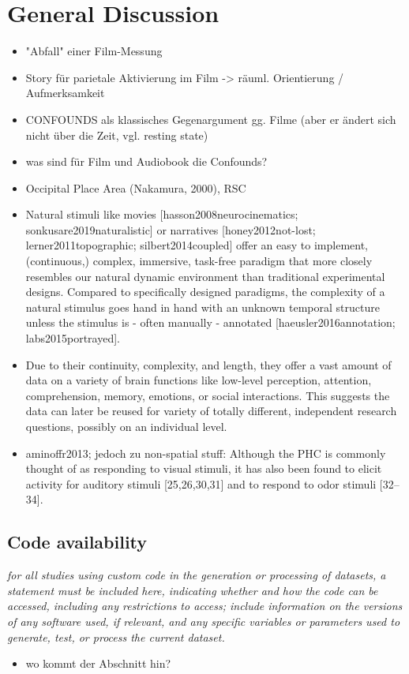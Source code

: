 \documentclass[english]{article}
\begin{document}
\section*{General Discussion}
\begin{itemize}
\item "Abfall" einer Film-Messung
\item Story für parietale Aktivierung im Film -> räuml. Orientierung / Aufmerksamkeit 
\item CONFOUNDS als klassisches Gegenargument gg. Filme (aber er ändert sich nicht über die Zeit, vgl. resting state)
\item was sind für Film und Audiobook die Confounds? 
\item Occipital Place Area (Nakamura, 2000), RSC
\item Natural stimuli like movies [hasson2008neurocinematics; sonkusare2019naturalistic] or narratives [honey2012not-lost; lerner2011topographic; silbert2014coupled] offer an easy to implement, (continuous,) complex, immersive, task-free paradigm that more closely resembles our natural dynamic environment than traditional experimental designs. Compared to specifically designed paradigms, the complexity of a natural stimulus goes hand in hand with an unknown temporal structure unless the stimulus is - often manually - annotated [haeusler2016annotation; labs2015portrayed]. 
\item Due to their continuity, complexity, and length, they offer a vast amount of data on a variety of brain functions like low-level perception, attention, comprehension, memory, emotions, or social interactions. This suggests the data can later be reused for variety of totally different, independent research questions, possibly on an individual level. 
\item aminoffr2013; jedoch zu non-spatial stuff: Although the PHC is commonly thought of as responding to visual stimuli, it has also been found to elicit activity for auditory stimuli [25,26,30,31] and to respond to odor stimuli [32–34].
\end{itemize}

\subsection*{Code availability}
\emph{for all studies using custom code in the generation or processing of datasets, 
a statement must be included here, indicating whether and how the code can be 
accessed, including any restrictions to access; include information on the versions 
of any software used, if relevant, and any specific variables or parameters used to 
generate, test, or process the current dataset. }
\begin{itemize}
\item wo kommt der Abschnitt hin?
\end{itemize}
\end{document}
